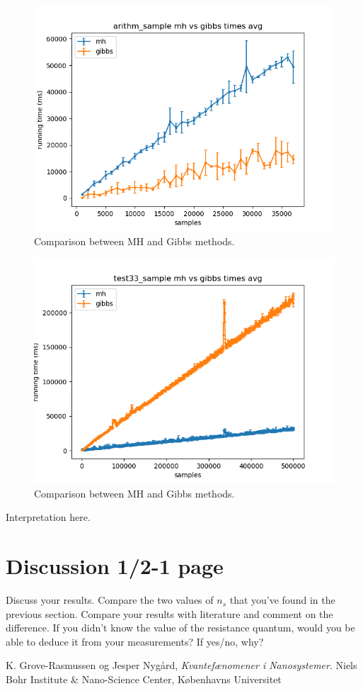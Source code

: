 \documentclass[a4paper]{article}
\begin{document}
\begin{figure}
\centering
\includegraphics[width=1\textwidth]{plot_arithm_sample_mh_vs_gibbs_times.png}
\caption{\label{fig:data}Comparison between MH and Gibbs methods.}
\end{figure}

\begin{figure}
\centering
\includegraphics[width=1\textwidth]{plot_test33_sample_mh_vs_gibbs_times.png}
\caption{\label{fig:data}Comparison between MH and Gibbs methods.}
\end{figure}

Interpretation here.

\section{Discussion 1/2-1 page}
Discuss your results. Compare the two values of $n_{s}$ that you've found in the previous section. Compare your results with literature and comment on the difference. If you didn't know the value of the resistance quantum, would you be able to deduce it from your measurements? If yes/no, why?

\begin{thebibliography}{9}
  K. Grove-Rasmussen og Jesper Nygård,
  \emph{Kvantefænomener i Nanosystemer}.
  Niels Bohr Institute \& Nano-Science Center, Københavns Universitet

\end{thebibliography}
\end{document}

